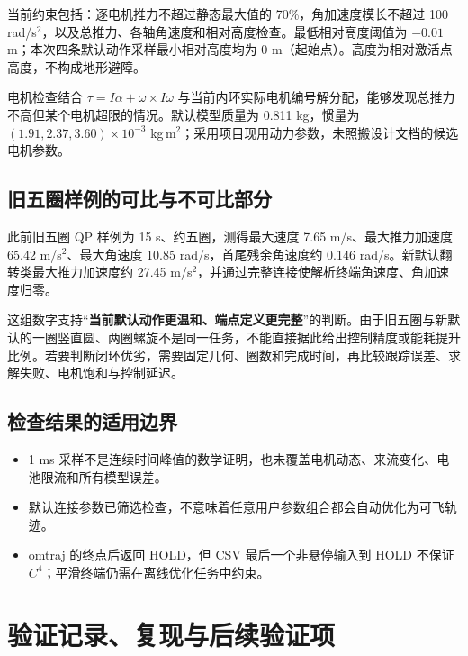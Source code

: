 \documentclass[UTF8,fontset=fandol,a4paper,10pt]{ctexart}
\renewcommand{\arraystretch}{1.3}
\begin{document}
当前约束包括：逐电机推力不超过静态最大值的 70\%，角加速度模长不超过 100 rad/s$^2$，以及总推力、各轴角速度和相对高度检查。最低相对高度阈值为 $-0.01$ m；本次四条默认动作采样最小相对高度均为 0 m（起始点）。高度为相对激活点高度，不构成地形避障。

电机检查结合 $\tau=I\alpha+\omega\times I\omega$ 与当前内环实际电机编号解分配，能够发现总推力不高但某个电机超限的情况。默认模型质量为 0.811 kg，惯量为 $(1.91,2.37,3.60)\times10^{-3}$ kg\,m$^2$；采用项目现用动力参数，未照搬设计文档的候选电机参数。

\subsection{旧五圈样例的可比与不可比部分}
此前旧五圈 QP 样例为 15 s、约五圈，测得最大速度 7.65 m/s、最大推力加速度 65.42 m/s$^2$、最大角速度 10.85 rad/s，首尾残余角速度约 0.146 rad/s。新默认翻转类最大推力加速度约 27.45 m/s$^2$，并通过完整连接使解析终端角速度、角加速度归零。

这组数字支持“\textbf{当前默认动作更温和、端点定义更完整}”的判断。由于旧五圈与新默认的一圈竖直圆、两圈螺旋不是同一任务，不能直接据此给出控制精度或能耗提升比例。若要判断闭环优劣，需要固定几何、圈数和完成时间，再比较跟踪误差、求解失败、电机饱和与控制延迟。

\subsection{检查结果的适用边界}
\begin{itemize}
\item 1 ms 采样不是连续时间峰值的数学证明，也未覆盖电机动态、来流变化、电池限流和所有模型误差。
\item 默认连接参数已筛选检查，不意味着任意用户参数组合都会自动优化为可飞轨迹。
\item omtraj 的终点后返回 HOLD，但 CSV 最后一个非悬停输入到 HOLD 不保证 $C^4$；平滑终端仍需在离线优化任务中约束。
\end{itemize}

\clearpage
\begingroup\setlength{\parskip}{2pt}\renewcommand{\arraystretch}{1.12}
\section{验证记录、复现与后续验证项}
\end{document}
